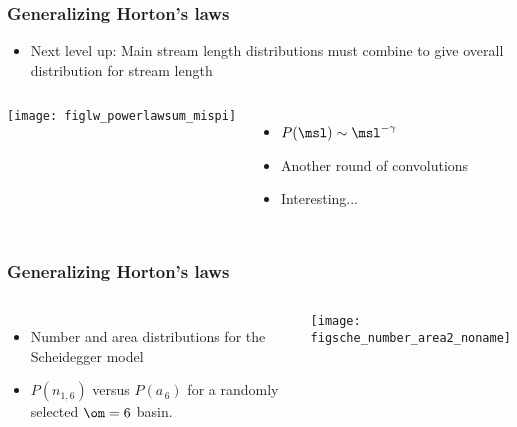 \begin{frame}[label=]
  \frametitle{Generalizing Horton's laws}

  \begin{itemize}
  \item Next level up: Main stream length distributions must
    combine to give overall distribution for stream length
  \end{itemize}
  \begin{columns}
    \texttt{[image: figlw\_powerlawsum\_mispi]}    
    \begin{itemize}
    \item<1-> 
      $ P(\msl) \sim \msl^{-\gamma} $ 
    \item<2-> 
      Another round of convolutions\cite{dodds2001b}
    \item<2-> 
      Interesting...
    \end{itemize}

  \end{columns}
  

\end{frame}



\begin{frame}[label=]
  \frametitle{Generalizing Horton's laws}

  \begin{columns}
    \begin{itemize}
    \item 
      Number and area distributions for the Scheidegger model\cite{dodds2001b}
    \item 
      $P(n_{1,6})$ versus $P(a_{\, 6})$
      for a randomly selected $\om=6$ basin.
    \end{itemize}
    \texttt{[image: figsche\_number\_area2\_noname]}
  \end{columns}

\end{frame}



